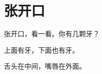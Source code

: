 \documentclass[12pt,UTF-8,openany]{ctexbook}
\begin{document}
\clearpage

\begin{center}
    
\end{center}


\hanzibox{}\hanzibox{}\hanzibox{}\hanzibox{}\hspace{1em}\hanzibox{}\hanzibox{}\hanzibox{}\hanzibox{}

\hanzibox{}\hanzibox{}\hanzibox{}\hanzibox{}\hspace{1em}\hanzibox{}\hanzibox{}\hanzibox{}\hanzibox{}

\hanzibox{}\hanzibox{}\hanzibox{}\hanzibox{}\hspace{1em}\hanzibox{}\hanzibox{}\hanzibox{}\hanzibox{}

\hanzibox{}\hanzibox{}\hanzibox{}\hanzibox{}\hspace{1em}\hanzibox{}\hanzibox{}\hanzibox{}\hanzibox{}






\chapter{张开口}

\begin{large}
    
    张开口，看一看。你有几颗牙？
    
    上面有牙，下面也有牙。
    
    舌头在中间，嘴唇在外面。
    
\end{large}


\clearpage

\begin{center}
    
\end{center}


\hanzibox{}\hanzibox{}\hanzibox{}\hanzibox{}\hspace{1em}\hanzibox{}\hanzibox{}\hanzibox{}\hanzibox{}

\hanzibox{}\hanzibox{}\hanzibox{}\hanzibox{}\hspace{1em}\hanzibox{}\hanzibox{}\hanzibox{}\hanzibox{}
\end{document}
